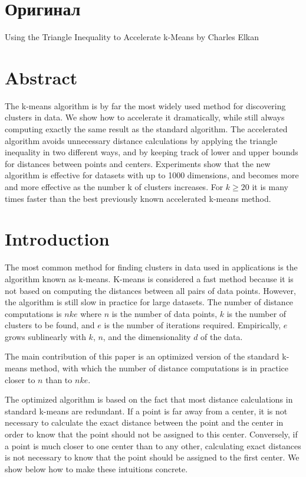 \newpage
\chapter*{Оригинал}
\vspace{-1ex}
\begin{center}
  Using the Triangle Inequality to Accelerate k-Means by Charles Elkan
\end{center}

\vspace{-1.5em}
\chapter*{Abstract}
The k-means algorithm is by far the most widely used method for discovering clusters in data. We show how to accelerate it dramatically, while still always computing exactly the same result as the standard algorithm. The accelerated algo\-rithm avoids unnecessary distance calculations by applying the triangle inequality in two different ways, and by keeping track of lower and upper bounds for distances between points and centers. Experiments show that the new algorithm is effective for datasets with up to 1000 dimensions, and becomes more and more effective as the number k of clusters increases. For \( k \ge 20 \) it is many times faster than the best previously known accelerated k-means method.

\chapter{Introduction}
The most common method for finding clusters in data used in applications is the algorithm known as k-means. K-means is considered a fast method because it is not based on computing the distances between all pairs of data points. However, the algorithm is still slow in practice for large datasets. The number of distance computations is \( nke \) where \( n \) is the number of data points, \( k \) is the number of
clusters to be found, and \( e \) is the number of iterations required. Empirically, \( e \) grows sublinearly with \( k \), \( n \), and the dimensionality \( d \) of the data.

The main contribution of this paper is an optimized version of the standard k-means method, with which the number of distance computations is in practice closer to \( n \) than to \( nke \).

The optimized algorithm is based on the fact that most distance calculations in standard k-means are redundant. If a point is far away from a center, it is not necessary to calculate the exact distance between the point and the center in order to know that the point should not be assigned to this center. Conversely, if a point is much closer to one center than to any other, calculating exact distances is not necessary to know that the point should be assigned to the first center. We show below how to make these intuitions concrete.

